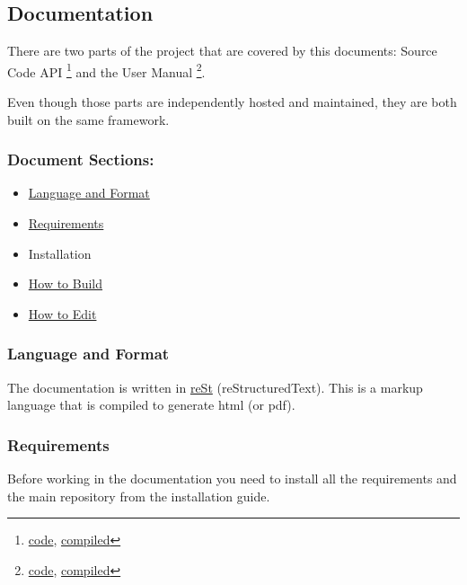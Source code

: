 \documentclass[a4,10pt,openany,oneside]{sphinxmanual}
\begin{document}
\subsection{Documentation}
\label{development/documentation:documentation}\label{development/documentation::doc}
There are two parts of the project that are covered by this documents:
Source Code API \footnote{
\href{https://github.com/BlenderVR/blender-vr}{code},  \href{http://blender-vr.readthedocs.org}{compiled}
} and the User Manual \footnote{
\href{https://github.com/BlenderVR/manual}{code},  \href{http://blender-vr-manual.readthedocs.org}{compiled}
}.

Even though those parts are independently hosted and maintained, they
are both built on the same framework.


\subsubsection{Document Sections:}
\label{development/documentation:document-sections}\begin{itemize}
\item {} 
{\hyperref[development/documentation:language-and-format]{Language and Format}}

\item {} 
{\hyperref[development/documentation:requirements]{Requirements}}

\item {} 
Installation

\item {} 
{\hyperref[development/documentation:how-to-build]{How to Build}}

\item {} 
{\hyperref[development/documentation:how-to-edit]{How to Edit}}

\end{itemize}


\subsubsection{Language and Format}
\label{development/documentation:language-and-format}
The documentation is written in \href{http://docutils.sourceforge.net/rst.html}{reSt} (reStructuredText).
This is a markup language that is compiled to generate html (or pdf).


\subsubsection{Requirements}
\label{development/documentation:requirements}
Before working in the documentation you need to install all the requirements and the main repository
from the installation guide.
\end{document}
